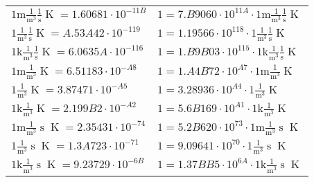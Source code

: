 \begin{center}
\begin{longtable}{l l}
{\color{gray}$1 \bm{\mathrm{ m}}\frac1{\operatorname{m}^3}\frac1{\operatorname{s}}{}{\operatorname{K}} = 1.60681\cdot10^{-11B} $}   & {\color{gray}$ 1 = 7.B9060\cdot10^{11A} \cdot 1 \bm{\mathrm{ m}}\frac1{\operatorname{m}^3}\frac1{\operatorname{s}}{}{\operatorname{K}}$}  \\
{\color{black}$1 \bm{\mathrm{ }}\frac1{\operatorname{m}^3}\frac1{\operatorname{s}}{}{\operatorname{K}} = A.53A42\cdot10^{-119} $}   & {\color{black}$ 1 = 1.19566\cdot10^{118} \cdot 1 \bm{\mathrm{ }}\frac1{\operatorname{m}^3}\frac1{\operatorname{s}}{}{\operatorname{K}}$}  \\
{\color{gray}$1 \bm{\mathrm{ k}}\frac1{\operatorname{m}^3}\frac1{\operatorname{s}}{}{\operatorname{K}} = 6.0635A\cdot10^{-116} $}   & {\color{gray}$ 1 = 1.B9B03\cdot10^{115} \cdot 1 \bm{\mathrm{ k}}\frac1{\operatorname{m}^3}\frac1{\operatorname{s}}{}{\operatorname{K}}$}  \\
{\color{gray}$1 \bm{\mathrm{ m}}\frac1{\operatorname{m}^3}{}{}{\operatorname{K}} = 6.51183\cdot10^{-A8} $}   & {\color{gray}$ 1 = 1.A4B72\cdot10^{A7} \cdot 1 \bm{\mathrm{ m}}\frac1{\operatorname{m}^3}{}{}{\operatorname{K}}$}  \\
{\color{black}$1 \bm{\mathrm{ }}\frac1{\operatorname{m}^3}{}{}{\operatorname{K}} = 3.87471\cdot10^{-A5} $}   & {\color{black}$ 1 = 3.28936\cdot10^{A4} \cdot 1 \bm{\mathrm{ }}\frac1{\operatorname{m}^3}{}{}{\operatorname{K}}$}  \\
{\color{gray}$1 \bm{\mathrm{ k}}\frac1{\operatorname{m}^3}{}{}{\operatorname{K}} = 2.199B2\cdot10^{-A2} $}   & {\color{gray}$ 1 = 5.6B169\cdot10^{A1} \cdot 1 \bm{\mathrm{ k}}\frac1{\operatorname{m}^3}{}{}{\operatorname{K}}$}  \\
{\color{gray}$1 \bm{\mathrm{ m}}\frac1{\operatorname{m}^3}{\operatorname{s}}{}{\operatorname{K}} = 2.35431\cdot10^{-74} $}   & {\color{gray}$ 1 = 5.2B620\cdot10^{73} \cdot 1 \bm{\mathrm{ m}}\frac1{\operatorname{m}^3}{\operatorname{s}}{}{\operatorname{K}}$}  \\
{\color{black}$1 \bm{\mathrm{ }}\frac1{\operatorname{m}^3}{\operatorname{s}}{}{\operatorname{K}} = 1.3A723\cdot10^{-71} $}   & {\color{black}$ 1 = 9.09641\cdot10^{70} \cdot 1 \bm{\mathrm{ }}\frac1{\operatorname{m}^3}{\operatorname{s}}{}{\operatorname{K}}$}  \\
{\color{gray}$1 \bm{\mathrm{ k}}\frac1{\operatorname{m}^3}{\operatorname{s}}{}{\operatorname{K}} = 9.23729\cdot10^{-6B} $}   & {\color{gray}$ 1 = 1.37BB5\cdot10^{6A} \cdot 1 \bm{\mathrm{ k}}\frac1{\operatorname{m}^3}{\operatorname{s}}{}{\operatorname{K}}$}  \\

\end{longtable}
\end{center}
